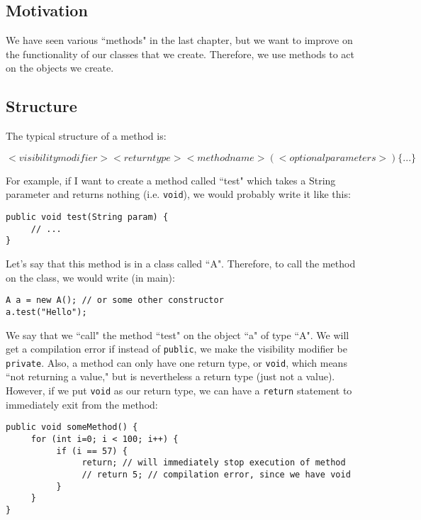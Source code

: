 
\subsection{Motivation}
We have seen various ``methods" in the last chapter, but we want to improve on the functionality of our classes that we create. Therefore, we use methods to act on the objects we create. 

\subsection{Structure}
The typical structure of a method is:
\begin{center}
$<visibilitymodifier> <return type> <method name>(<optional parameters>) \{...\}$
\end{center}
For example, if I want to create a method called ``test" which takes a String parameter and returns nothing (i.e. \verb|void|), we would probably write it like this:
\begin{lstlisting}
public void test(String param) {
     // ...
}
\end{lstlisting}
Let's say that this method is in a class called ``A". Therefore, to call the method on the class, we would write (in main):
\begin{lstlisting}
A a = new A(); // or some other constructor
a.test("Hello");
\end{lstlisting}
We say that we ``call" the method ``test" on the object ``a" of type ``A". We will get a compilation error if instead of \verb|public|, we make the visibility modifier be \verb|private|. Also, a method can only have one return type, or \verb|void|, which means ``not returning a value," but is nevertheless a return type (just not a value). However, if we put \verb|void| as our return type, we can have a \verb|return| statement to immediately exit from the method:
\begin{lstlisting}
public void someMethod() {
     for (int i=0; i < 100; i++) {
          if (i == 57) {
               return; // will immediately stop execution of method
               // return 5; // compilation error, since we have void
          }
     }
}
\end{lstlisting}

